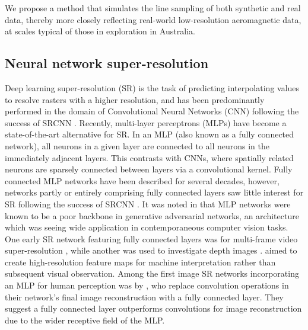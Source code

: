 We propose a method that simulates the line sampling of both synthetic and real data, thereby more closely reflecting real-world low-resolution aeromagnetic data, at scales typical of those in exploration in Australia.

\subsection{Neural network super-resolution}
\label{sec:2nnsr}
Deep learning super-resolution (SR) is the task of predicting interpolating values to resolve rasters with a higher resolution, and has been predominantly performed in the domain of Convolutional Neural Networks (CNN) following the success of SRCNN \parencite{dongLearningDeepConvolutional2014}.
Recently, multi-layer perceptrons (MLPs) have become a state-of-the-art alternative for SR\@.
In an MLP (also known as a fully connected network), all neurons in a given layer are connected to all neurons in the immediately adjacent layers.
This contrasts with CNNs, where spatially related neurons are sparsely connected between layers via a convolutional kernel.
Fully connected MLP networks have been described for several decades, however, networks partly or entirely comprising fully connected layers saw little interest for SR following the success of SRCNN \parencite{dongLearningDeepConvolutional2014}.
It was noted in \parencite{arjovskyWassersteinGAN2017} that MLP networks were known to be a poor backbone in generative adversarial networks, an architecture which was seeing wide application in contemporaneous computer vision tasks.
One early SR network featuring fully connected layers was for multi-frame video super-resolution \parencite{chengFastVideoSuperresolution2012}, while another was used to investigate depth images \parencite{chenSingleDepthImage2018}.
\Textcite{tanFeatureSuperResolutionMake2018} aimed to create high-resolution feature maps for machine interpretation rather than subsequent visual observation.
Among the first image SR networks incorporating an MLP for human perception was by \parencite{tangDeepResidualNetworks2020}, who replace convolution operations in their network's final image reconstruction with a fully connected layer.
They suggest a fully connected layer outperforms convolutions for image reconstruction due to the wider receptive field of the MLP\@.

